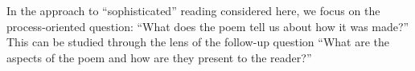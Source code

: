 In the approach to ``sophisticated'' reading considered here, we focus
on the process-oriented question: ``What does the poem tell us about
how it was made?''  This can be studied through the lens of the
follow-up question ``What are the aspects of the poem and how are they
present to the reader?''




